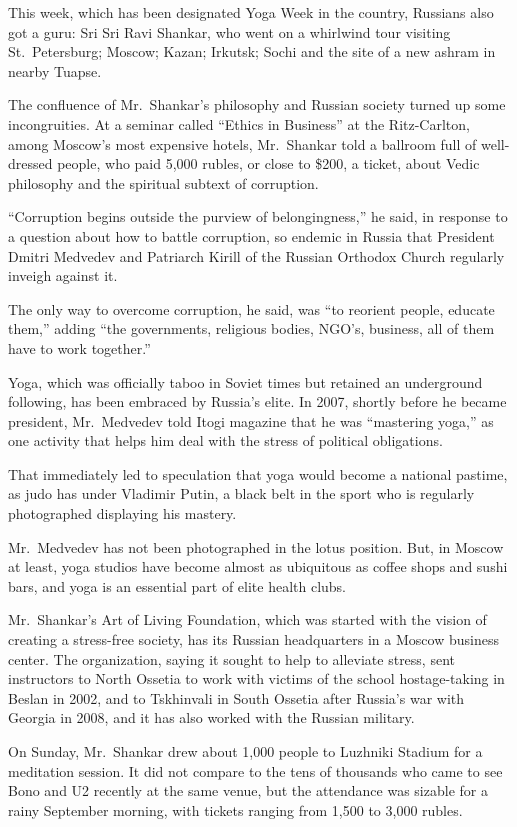 ﻿\documentclass[12pt]{article}
\begin{document}
This week, which has been designated Yoga Week in the country, Russians also got a guru: Sri Sri
Ravi Shankar, who went on a whirlwind tour visiting St.~Petersburg; Moscow; Kazan; Irkutsk; Sochi
and the site of a new ashram in nearby Tuapse.

The confluence of Mr.~Shankar's philosophy and Russian society turned up some incongruities. At a
seminar called ``Ethics in Business'' at the Ritz-Carlton, among Moscow's most expensive hotels,
Mr.~Shankar told a ballroom full of well-dressed people, who paid 5,000 rubles, or close to \$200, a
ticket, about Vedic philosophy and the spiritual subtext of corruption.

``Corruption begins outside the purview of belongingness,'' he said, in response to a question about
how to battle corruption, so endemic in Russia that President Dmitri Medvedev and Patriarch Kirill
of the Russian Orthodox Church regularly inveigh against it.

The only way to overcome corruption, he said, was ``to reorient people, educate them,'' adding ``the
governments, religious bodies, NGO's, business, all of them have to work together.''

Yoga, which was officially taboo in Soviet times but retained an underground following, has been
embraced by Russia's elite. In 2007, shortly before he became president, Mr.~Medvedev told Itogi
magazine that he was ``mastering yoga,'' as one activity that helps him deal with the stress of
political obligations.

That immediately led to speculation that yoga would become a national pastime, as judo has under
Vladimir Putin, a black belt in the sport who is regularly photographed displaying his mastery.

Mr.~Medvedev has not been photographed in the lotus position. But, in Moscow at least, yoga studios
have become almost as ubiquitous as coffee shops and sushi bars, and yoga is an essential part of
elite health clubs.

Mr.~Shankar's Art of Living Foundation, which was started with the vision of creating a stress-free
society, has its Russian headquarters in a Moscow business center. The organization, saying it
sought to help to alleviate stress, sent instructors to North Ossetia to work with victims of the
school hostage-taking in Beslan in 2002, and to Tskhinvali in South Ossetia after Russia's war with
Georgia in 2008, and it has also worked with the Russian military.

On Sunday, Mr.~Shankar drew about 1,000 people to Luzhniki Stadium for a meditation session. It did
not compare to the tens of thousands who came to see Bono and U2 recently at the same venue, but the
attendance was sizable for a rainy September morning, with tickets ranging from 1,500 to 3,000
rubles.
\end{document}
